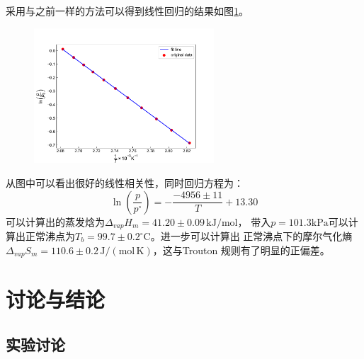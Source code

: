 \documentclass[12pt]{article}
\newcommand{\mr}[1]{\mathrm{#1}}
\def\celsius{^{\circ}\mr{C}}  %
\begin{document}
		采用与之前一样的方法可以得到线性回归的结果如图\ref{P-T of H2O}。
		\begin{figure}[h]
			\centering
			\includegraphics[width=0.6\textwidth]{water.pdf}
			\label{P-T of H2O}
		\end{figure}
		从图中可以看出很好的线性相关性，同时回归方程为：
		\begin{equation}
			\ln\left(\dfrac{p}{p^{\circ}}\right) = -\dfrac{-4956\pm 11}{T} + 13.30
		\end{equation}
		可以计算出的蒸发焓为$\Delta_{vap}H_{m} = 41.20\pm 0.09\,\mr{kJ/mol}$，
		带入$p = 101.3\mr{kPa}$可以计算出正常沸点为$T_b = 99.7\pm0.2\celsius$。进一步可以计算出
		正常沸点下的摩尔气化熵$\Delta_{vap}S_{m} = 110.6\pm0.2\,\mr{J/(mol\,K)}$，这与Trouton
		规则有了明显的正偏差。
 	
 		 

	\vbox{}  	
 	\section{讨论与结论}
		\subsection{实验讨论}
\end{document}
